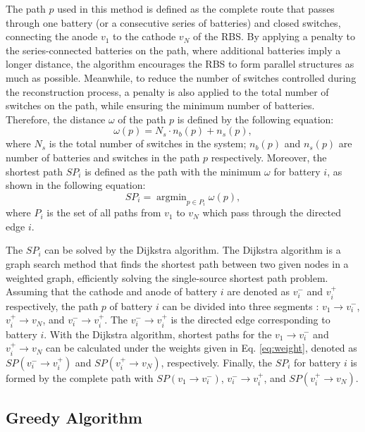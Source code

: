 \documentclass{article}
\begin{document}
The path $p$ used in this method is defined as the complete route that passes through one battery (or a consecutive series of batteries) and closed switches, connecting the anode $v_1$ to the cathode $v_N$ of the RBS.
By applying a penalty to the series-connected batteries on the path, where additional batteries imply a longer distance, the algorithm encourages the RBS to form parallel structures as much as possible.
Meanwhile, to reduce the number of switches controlled during the reconstruction process, a penalty is also applied to the total number of switches on the path, while ensuring the minimum number of batteries.
Therefore, the distance $\omega$ of the path $p$ is defined by the following equation: 
\begin{equation}\label{eq:weight}
    \omega(p) = N_s \cdot n_b (p) + n_s (p),
\end{equation}
where $N_s$ is the total number of switches in the system; 
$n_b(p)$ and $n_s(p)$ are number of batteries and switches in the path $p$ respectively. 
Moreover, the shortest path $SP_i$ is defined as the path with the minimum $\omega$ for battery $i$, as shown in the following equation:
\begin{equation}\label{eq:def_sp}
    SP_i = \mathop{\arg\min}_{p \in P_i} \omega(p),
\end{equation}
where $P_i$ is the set of all paths from $v_1$ to $v_N$ which pass through the directed edge $i$.


The $SP_i$ can be solved by the Dijkstra algorithm.
The Dijkstra algorithm is a graph search method that finds the shortest path between two given nodes in a weighted graph, efficiently solving the single-source shortest path problem.
Assuming that the cathode and anode of battery $i$ are denoted as $v_i^-$ and $v_i^+$ respectively, the path $p$ of battery $i$  can be divided into three segments : $v_1 \rightarrow v_i^-$, $v_i^+ \rightarrow v_N$, and $v_i^- \rightarrow v_i^+$.
The $v_i^- \rightarrow v_i^+$ is the directed edge corresponding to battery $i$. 
With the Dijkstra algorithm, shortest paths for the $v_1 \rightarrow v_i^-$ and $v_i^+ \rightarrow v_N$ can be calculated under the weights given in Eq. \ref{eq:weight}, denoted as $SP(v_i^- \rightarrow v_i^+)$ and $SP(v_i^+ \rightarrow v_N)$, respectively.
Finally, the $SP_i$ for battery $i$ is formed by the complete path with $SP(v_1 \rightarrow v_i^-)$, $v_i^- \rightarrow v_i^+$, and $SP(v_i^+ \rightarrow v_N)$.

\subsection{Greedy Algorithm}\label{subsec:greedy_solution}
\end{document}

